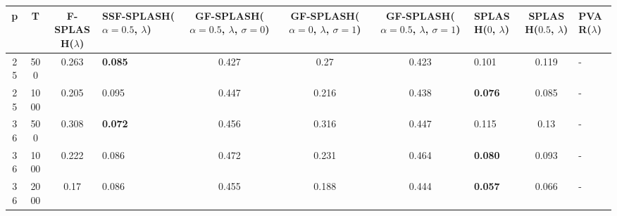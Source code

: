\begin{tabular}{ccclccclcl}
\hline
  p  &  T   &  F-SPLASH($\lambda$)  & SSF-SPLASH($\alpha=0.5$, $\lambda$)   &  GF-SPLASH($\alpha=0.5$, $\lambda$, $\sigma=0$)  &  GF-SPLASH($\alpha=0$, $\lambda$, $\sigma=1$)  &  GF-SPLASH($\alpha=0.5$, $\lambda$, $\sigma=1$)  & SPLASH($0$, $\lambda$)   &  SPLASH($0.5$, $\lambda$)  & PVAR($\lambda$)   \\
\hline
 25  & 500  &         0.263         & \textbf{0.085}                        &                      0.427                       &                      0.27                      &                      0.423                       & 0.101                    &           0.119            & -                 \\
 25  & 1000 &         0.205         & 0.095                                 &                      0.447                       &                     0.216                      &                      0.438                       & \textbf{0.076}           &           0.085            & -                 \\
 36  & 500  &         0.308         & \textbf{0.072}                        &                      0.456                       &                     0.316                      &                      0.447                       & 0.115                    &            0.13            & -                 \\
 36  & 1000 &         0.222         & 0.086                                 &                      0.472                       &                     0.231                      &                      0.464                       & \textbf{0.080}           &           0.093            & -                 \\
 36  & 2000 &         0.17          & 0.086                                 &                      0.455                       &                     0.188                      &                      0.444                       & \textbf{0.057}           &           0.066            & -                 \\
\hline
\end{tabular}